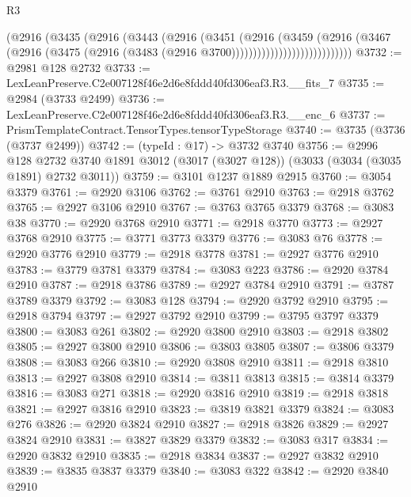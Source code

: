 \begin{lexlean}{R3}
\begin{coremodule}
                              (@2916
                                (@3435
                                  (@2916
                                    (@3443
                                      (@2916
                                        (@3451
                                          (@2916
                                            (@3459
                                              (@2916
                                                (@3467
                                                  (@2916
                                                    (@3475
                                                      (@2916
                                                        (@3483
                                                          (@2916 @3700))))))))))))))))))))))))))))
@3732 := @2981 @128 @2732
@3733 := LexLeanPreserve.C2e007128f46e2d6e8fddd40fd306eaf3.R3.__fits_7
@3735 := @2984 (@3733 @2499)
@3736 := LexLeanPreserve.C2e007128f46e2d6e8fddd40fd306eaf3.R3.__enc_6
@3737 := PrismTemplateContract.TensorTypes.tensorTypeStorage
@3740 := @3735 (@3736 (@3737 @2499))
@3742 := (typeId : @17) -> @3732 @3740
@3756 := @2996
    @128
    @2732
    @3740
    @1891
    @3012
    (@3017 (@3027 @128))
    (@3033 (@3034 (@3035 @1891) @2732 @3011))
@3759 := @3101 @1237 @1889 @2915
@3760 := @3054 @3379
@3761 := @2920 @3106
@3762 := @3761 @2910
@3763 := @2918 @3762
@3765 := @2927 @3106 @2910
@3767 := @3763 @3765 @3379
@3768 := @3083 @38
@3770 := @2920 @3768 @2910
@3771 := @2918 @3770
@3773 := @2927 @3768 @2910
@3775 := @3771 @3773 @3379
@3776 := @3083 @76
@3778 := @2920 @3776 @2910
@3779 := @2918 @3778
@3781 := @2927 @3776 @2910
@3783 := @3779 @3781 @3379
@3784 := @3083 @223
@3786 := @2920 @3784 @2910
@3787 := @2918 @3786
@3789 := @2927 @3784 @2910
@3791 := @3787 @3789 @3379
@3792 := @3083 @128
@3794 := @2920 @3792 @2910
@3795 := @2918 @3794
@3797 := @2927 @3792 @2910
@3799 := @3795 @3797 @3379
@3800 := @3083 @261
@3802 := @2920 @3800 @2910
@3803 := @2918 @3802
@3805 := @2927 @3800 @2910
@3806 := @3803 @3805
@3807 := @3806 @3379
@3808 := @3083 @266
@3810 := @2920 @3808 @2910
@3811 := @2918 @3810
@3813 := @2927 @3808 @2910
@3814 := @3811 @3813
@3815 := @3814 @3379
@3816 := @3083 @271
@3818 := @2920 @3816 @2910
@3819 := @2918 @3818
@3821 := @2927 @3816 @2910
@3823 := @3819 @3821 @3379
@3824 := @3083 @276
@3826 := @2920 @3824 @2910
@3827 := @2918 @3826
@3829 := @2927 @3824 @2910
@3831 := @3827 @3829 @3379
@3832 := @3083 @317
@3834 := @2920 @3832 @2910
@3835 := @2918 @3834
@3837 := @2927 @3832 @2910
@3839 := @3835 @3837 @3379
@3840 := @3083 @322
@3842 := @2920 @3840 @2910

\end{coremodule}
\end{lexlean}
